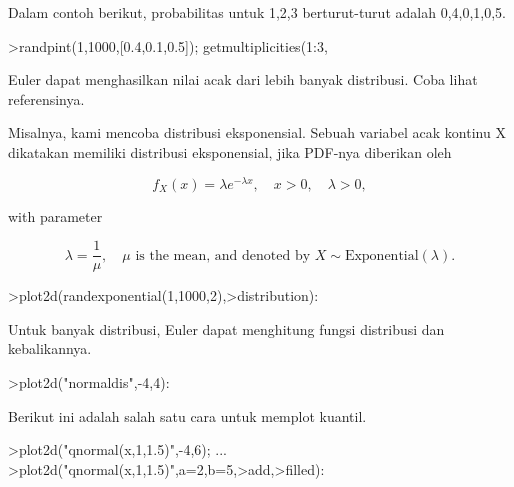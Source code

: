 \documentclass{article}
\begin{document}
\begin{eulernotebook}
\begin{eulercomment}
\begin{eulercomment}
\begin{eulercomment}
Dalam contoh berikut, probabilitas untuk 1,2,3 berturut-turut adalah
0,4,0,1,0,5.
\end{eulercomment}
\begin{eulerprompt}
>randpint(1,1000,[0.4,0.1,0.5]); getmultiplicities(1:3,%
\end{eulerprompt}
\begin{euleroutput}
  [378,  102,  520]
\end{euleroutput}
\begin{eulercomment}
Euler dapat menghasilkan nilai acak dari lebih banyak distribusi. Coba
lihat referensinya.

Misalnya, kami mencoba distribusi eksponensial. Sebuah variabel acak
kontinu X dikatakan memiliki distribusi eksponensial, jika PDF-nya
diberikan oleh\\
\end{eulercomment}
\begin{eulerformula}
\[
f_X(x)=\lambda e^{-\lambda x},\quad x>0,\quad \lambda>0,
\]
\end{eulerformula}
\begin{eulercomment}
with parameter\\
\end{eulercomment}
\begin{eulerformula}
\[
\lambda=\frac{1}{\mu},\quad \mu \text{ is the mean, and denoted by } X \sim \text{Exponential}(\lambda).
\]
\end{eulerformula}
\begin{eulerprompt}
>plot2d(randexponential(1,1000,2),>distribution):
\end{eulerprompt}
\begin{eulercomment}
Untuk banyak distribusi, Euler dapat menghitung fungsi distribusi dan
kebalikannya.
\end{eulercomment}
\begin{eulerprompt}
>plot2d("normaldis",-4,4): 
\end{eulerprompt}
\begin{eulercomment}
Berikut ini adalah salah satu cara untuk memplot kuantil.
\end{eulercomment}
\begin{eulerprompt}
>plot2d("qnormal(x,1,1.5)",-4,6);  ...
>plot2d("qnormal(x,1,1.5)",a=2,b=5,>add,>filled):
\end{eulerprompt}
\begin{eulerformula}

\end{eulerformula}
\end{eulercomment}
\end{eulercomment}
\end{eulernotebook}
\end{document}
